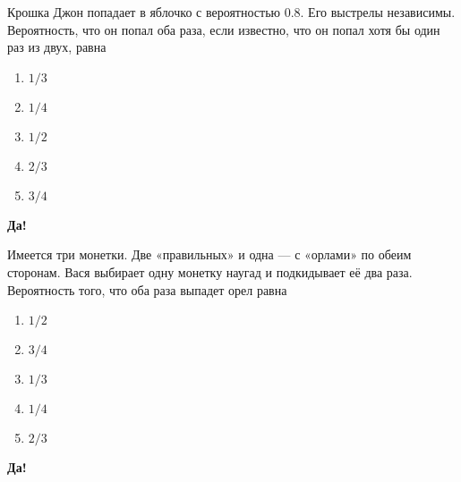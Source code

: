 \documentclass[t]{beamer}
\begin{document}
 \begin{frame} \label{2-Yes} 
\begin{block}{2} 

Крошка Джон попадает в яблочко с вероятностью $0.8$. Его выстрелы независимы. Вероятность, что он попал оба раза, если известно, что он попал хотя бы один раз из двух, равна
    


 \end{block} 
\begin{enumerate} 
\item[] \hyperlink{2-No}{\beamergotobutton{} $1/3$}
\item[] \hyperlink{2-No}{\beamergotobutton{} $1/4$
}
\item[] \hyperlink{2-No}{\beamergotobutton{} $1/2$}
\item[] \hyperlink{2-Yes}{\beamergotobutton{} $2/3$}
\item[] \hyperlink{2-No}{\beamergotobutton{} $3/4$}
\end{enumerate} 

 \textbf{Да!} 
 \hyperlink{3}{}\end{frame} 


 \begin{frame} \label{3-Yes} 
\begin{block}{3} 

Имеется три монетки. Две «правильных» и одна — с «орлами» по обеим сторонам. Вася выбирает одну монетку наугад и подкидывает её два раза. Вероятность того, что оба раза выпадет орел равна
     


 \end{block} 
\begin{enumerate} 
\item[] \hyperlink{3-Yes}{\beamergotobutton{} $1/2$}
\item[] \hyperlink{3-No}{\beamergotobutton{} $3/4$
}
\item[] \hyperlink{3-No}{\beamergotobutton{} $1/3$}
\item[] \hyperlink{3-No}{\beamergotobutton{} $1/4$}
\item[] \hyperlink{3-No}{\beamergotobutton{} $2/3$}
\end{enumerate} 

 \textbf{Да!} 
 \hyperlink{4}{}\end{frame} 
\end{document}
